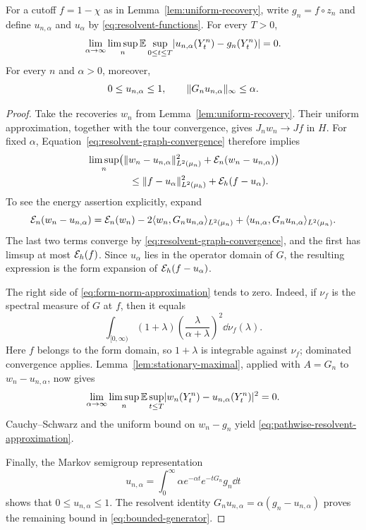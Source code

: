\begin{lemma}\label{lem:resolvent-approximation}
For a cutoff $f=1-\chi$ as in Lemma~\ref{lem:uniform-recovery}, write
$g_n=f\circ z_n$ and define $u_{n,\alpha}$ and $u_\alpha$ by
\eqref{eq:resolvent-functions}. For every $T>0$,
\begin{equation}\label{eq:pathwise-resolvent-approximation}
 \lim_{\alpha\to\infty}\limsup_n
 \mathbb E\sup_{0\le t\le T}
       \lvert u_{n,\alpha}(Y^n_t)-g_n(Y^n_t)\rvert=0.
\end{equation}
For every $n$ and $\alpha>0$, moreover,
\begin{equation}\label{eq:bounded-generator}
 0\le u_{n,\alpha}\le1,
 \qquad \lVert G_nu_{n,\alpha}\rVert_\infty\le\alpha.
\end{equation}
\end{lemma}

\begin{proof}
Take the recoveries $w_n$ from Lemma~\ref{lem:uniform-recovery}. Their uniform
approximation, together with the tour convergence, gives $J_nw_n\to Jf$ in
$H$. For fixed $\alpha$, Equation~\eqref{eq:resolvent-graph-convergence}
therefore implies
\begin{align}
 &\limsup_n\bigl(
   \norm{w_n-u_{n,\alpha}}_{L^2(\mu_n)}^2
       +\E_n(w_n-u_{n,\alpha})\bigr)\notag\\
 &\hspace{15mm}\le
   \norm{f-u_\alpha}_{L^2(\mu_h)}^2+\E_h(f-u_\alpha).
 \label{eq:form-norm-approximation}
\end{align}
To see the energy assertion explicitly, expand
\[
 \mathcal E_n(w_n-u_{n,\alpha})
 =\mathcal E_n(w_n)-2\langle w_n,G_nu_{n,\alpha}\rangle_{L^2(\mu_n)}
            +\langle u_{n,\alpha},G_nu_{n,\alpha}\rangle_{L^2(\mu_n)}.
\]
The last two terms converge by \eqref{eq:resolvent-graph-convergence}, and
the first has limsup at most $\mathcal E_h(f)$. Since $u_\alpha$ lies in the operator
domain of $G$, the resulting expression is the form expansion of
$\mathcal E_h(f-u_\alpha)$.

The right side of \eqref{eq:form-norm-approximation} tends to zero. Indeed,
if $\nu_f$ is the spectral measure of $G$ at $f$, then it equals
\[
 \int_{[0,\infty)}(1+\lambda)
       \left(\frac{\lambda}{\alpha+\lambda}\right)^2\dd\nu_f(\lambda).
\]
Here $f$ belongs to the form domain, so $1+\lambda$ is integrable against
$\nu_f$; dominated convergence applies. Lemma~\ref{lem:stationary-maximal},
applied with $A=G_n$ to $w_n-u_{n,\alpha}$, now gives
\[
 \lim_{\alpha\to\infty}\limsup_n
 \mathbb E\sup_{t\le T}\lvert w_n(Y^n_t)-u_{n,\alpha}(Y^n_t)\rvert^2=0.
\]
Cauchy--Schwarz and the uniform bound on $w_n-g_n$ yield
\eqref{eq:pathwise-resolvent-approximation}.

Finally, the Markov semigroup representation
\[
 u_{n,\alpha}=\int_0^\infty\alpha e^{-\alpha t}
                              e^{-tG_n}g_n\dd t
\]
shows that $0\le u_{n,\alpha}\le1$. The resolvent identity
$G_nu_{n,\alpha}=\alpha(g_n-u_{n,\alpha})$ proves the remaining bound in
\eqref{eq:bounded-generator}.
\end{proof}


